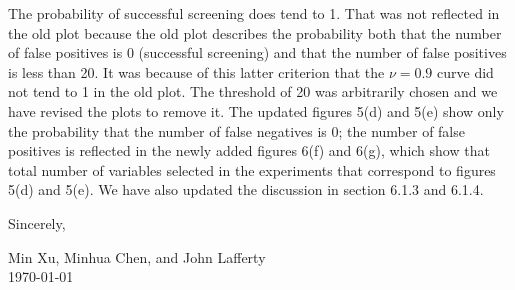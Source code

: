 \documentclass[pdftex,12pt]{article}
\begin{document}
\begin{enumerate}
The probability of successful screening does tend to 1. That was not reflected in the old plot because the old plot describes the probability both that the number of false positives is 0 (successful screening) and that the number of false positives is less than 20. It was because of this latter criterion that the $\nu =0.9$ curve did not tend to 1 in the old plot. The threshold of 20 was arbitrarily chosen and we have revised the plots to remove it. The updated figures 5(d) and 5(e) show only the probability that the number of false negatives is 0; the number of false positives is reflected in the newly added figures 6(f) and 6(g), which show that total number of variables selected in the experiments that correspond to figures 5(d) and 5(e). We have also updated the discussion in section 6.1.3 and 6.1.4.

\end{enumerate}




\vspace*{10pt}

Sincerely, 


Min Xu, Minhua Chen, and John Lafferty\\[1pt]
\today{}


\end{document}
